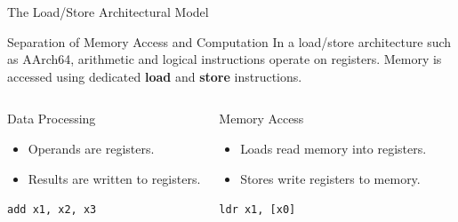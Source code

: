 \documentclass[aspectratio=169,11pt,t]{beamer}
\newcommand{\key}[1]{\textbf{#1}}
\newcommand{\code}[1]{\texttt{#1}}
\begin{document}
\begin{frame}{The Load/Store Architectural Model}

\begin{block}{Separation of Memory Access and Computation}
In a load/store architecture such as AArch64,
arithmetic and logical instructions operate on registers.
Memory is accessed using dedicated
\key{load}
and
\key{store}
instructions.
\end{block}

\vspace{0.15cm}

\begin{columns}[T,onlytextwidth]


\begin{block}{Data Processing}
\begin{itemize}
  \item Operands are registers.
  \item Results are written to registers.
\end{itemize}

\begin{center}
\large
\code{add x1, x2, x3}
\end{center}
\end{block}


\begin{block}{Memory Access}
\begin{itemize}
  \item Loads read memory into registers.
  \item Stores write registers to memory.
\end{itemize}

\begin{center}
\large
\code{ldr x1, [x0]}
\end{center}
\end{block}

\end{columns}

\end{frame}



\end{document}
